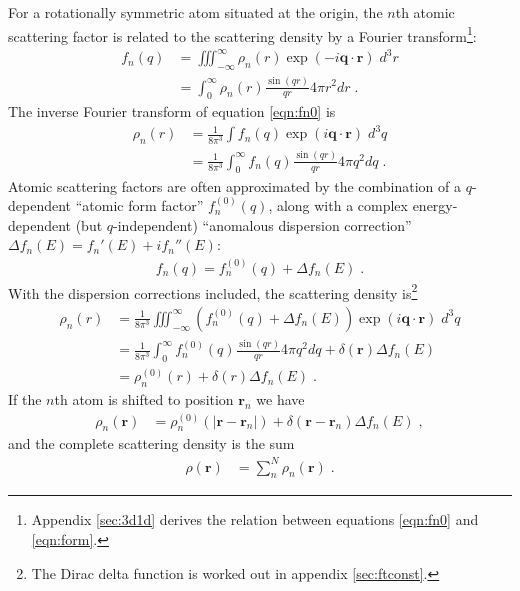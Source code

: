 \documentclass[11pt]{article}
\renewcommand{\vec}[1]{\boldsymbol{#1}}
\begin{document}
For a rotationally symmetric atom situated at the origin, the $n$th atomic 
scattering factor is related to the scattering density by a Fourier 
transform\footnote{Appendix \ref{sec:3d1d} derives the relation between 
equations \ref{eqn:fn0} and \ref{eqn:form}.}:
\begin{align}\label{eqn:fn0}
f_n(q)  &= \iiint_{-\infty}^\infty \rho_n(r) \exp(-i \vec{q}\cdot\vec{r}) \; d^3r \\
  &= \int_0^\infty \rho_n(r)   \frac{\sin(qr)}{qr}  4\pi r^2 dr \; . \label{eqn:form}
\end{align}
The inverse Fourier transform of equation \ref{eqn:fn0} is
\begin{align}
\rho_n(r)  &= \frac{1}{8\pi^{3}} \int  f_n(q)  \exp(i \vec{q}\cdot\vec{r}) \; d^3q \\
&= \frac{1}{8\pi^{3}} \int_0^\infty f_n(q)   \frac{\sin(qr)}{qr}  4\pi q^2 dq \; . \label{rhor}
\end{align}
Atomic scattering factors are often approximated by the combination of a 
$q$-dependent ``atomic form factor'' $f_n^{(0)}(q)$, along with a complex 
energy-dependent (but $q$-independent) ``anomalous dispersion correction'' 
$\Delta f_n(E) =  f_n'(E) + i f_n''(E)$:
\begin{align}
f_n(q) = f_n^{(0)}(q) + \Delta f_n(E) \; . %
\end{align}
With the dispersion corrections included, the scattering density is\footnote{The
Dirac delta function is worked out in appendix \ref{sec:ftconst}.}
\begin{align}
\rho_n(r)  &= \frac{1}{8\pi^{3}} \iiint_{-\infty}^\infty  (f_n^{(0)}(q) + \Delta f_n(E))   \exp(i \vec{q}\cdot\vec{r}) \; d^3q \\
&=   \frac{1}{8\pi^{3}} \int_0^\infty f_n^{(0)}(q)    \frac{\sin(qr)}{qr}  4\pi q^2 dq + \delta(\vec{r}) \Delta f_n(E) \\
&=   \rho_n^{(0)}(r) + \delta(r) \Delta f_n(E)\; .
\end{align}
If the $n$th atom is shifted to position $\vec{r}_n$ we have
\begin{align}
\rho_n(\vec{r})  &= \rho_n^{(0)}(|\vec{r}-\vec{r}_n|) +  \delta(\vec{r}-\vec{r}_n) \Delta f_n(E)  \; ,
\end{align}
and the complete scattering density is the sum
\begin{align}
\rho(\vec{r})  &= \sum_n^N \rho_n(\vec{r}) \; .
\end{align}
\end{document}

